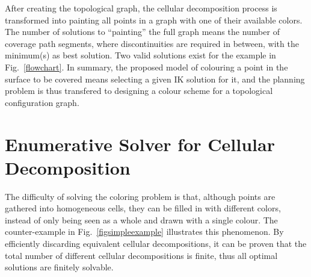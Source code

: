 \documentclass[journal]{IEEEtran}
\begin{document}
After creating the topological graph, the cellular decomposition process is transformed into painting all points in a graph with 
one of their available colors.
The number of %
solutions to ``painting'' the full graph means the number of coverage path segments, where discontinuities are required in between, with the minimum(s) as best solution. Two valid solutions exist for the example in Fig.~\ref{flowchart}. 
In summary, the proposed model of colouring a point in the surface to be covered means selecting a given IK solution for it, 
and the planning problem is thus transfered to designing a colour scheme for a topological configuration graph.

\section{Enumerative Solver for Cellular Decomposition}
\label{sectionenumerativesolver}
The difficulty of solving the coloring problem is that, although points are gathered into homogeneous cells, 
they can be filled in with different colors, instead of only being seen as a whole and drawn with a single colour. 
The counter-example in Fig.~\ref{figsimpleexample} illustrates this phenomenon. 
By efficiently discarding equivalent cellular decompositions, it can be proven that the total number of different cellular 
decompositions is finite, thus all optimal solutions are finitely solvable. 
\end{document}
